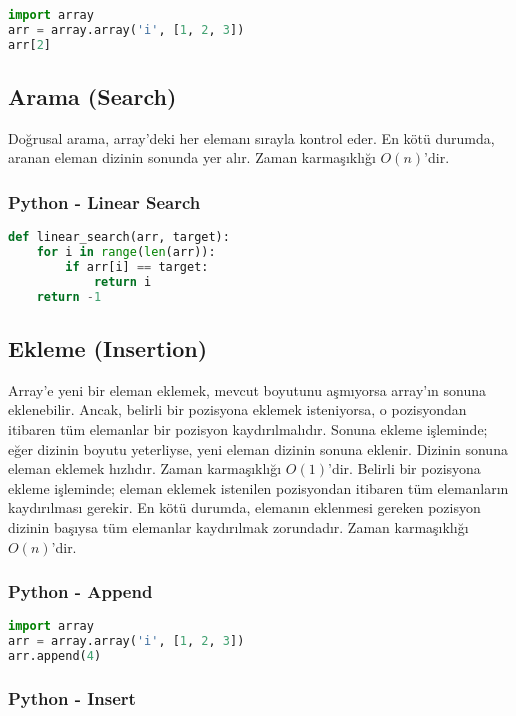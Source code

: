\begin{lstlisting}[language=Python]
import array
arr = array.array('i', [1, 2, 3])
arr[2]
\end{lstlisting}

\subsection{Arama (Search)}

Doğrusal arama, array'deki her elemanı sırayla kontrol eder. En kötü durumda, aranan eleman dizinin sonunda yer alır. Zaman karmaşıklığı $O(n)$'dir.

\subsubsection{Python - Linear Search}

\begin{lstlisting}[language=Python]
def linear_search(arr, target):
    for i in range(len(arr)):
        if arr[i] == target:
            return i
    return -1
\end{lstlisting}

\subsection{Ekleme (Insertion)}

Array'e yeni bir eleman eklemek, mevcut boyutunu aşmıyorsa array'ın sonuna eklenebilir. Ancak, belirli bir pozisyona eklemek isteniyorsa, o pozisyondan itibaren tüm elemanlar bir pozisyon kaydırılmalıdır. Sonuna ekleme işleminde; eğer dizinin boyutu yeterliyse, yeni eleman dizinin sonuna eklenir. Dizinin sonuna eleman eklemek hızlıdır. Zaman karmaşıklığı $O(1)$'dir. Belirli bir pozisyona ekleme işleminde; eleman eklemek istenilen pozisyondan itibaren tüm elemanların kaydırılması gerekir. En kötü durumda, elemanın eklenmesi gereken pozisyon dizinin başıysa tüm elemanlar kaydırılmak zorundadır. Zaman karmaşıklığı $O(n)$'dir.

\subsubsection{Python - Append}

\begin{lstlisting}[language=Python]
import array
arr = array.array('i', [1, 2, 3])
arr.append(4)
\end{lstlisting}

\subsubsection{Python - Insert}

